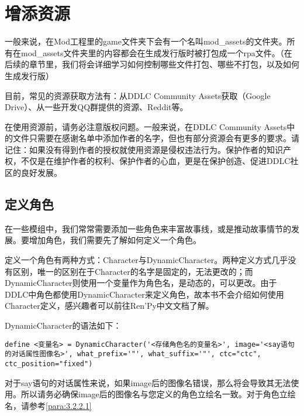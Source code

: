 \section{增添资源}
一般来说，在Mod工程里的game文件夹下会有一个名叫mod\_assets的文件夹。所有在mod\_assets文件夹里的内容都会在生成发行版时被打包成一个rpa文件。（在后续的章节里，我们将会详细学习如何控制哪些文件打包、哪些不打包，以及如何生成发行版）

\begin{ExtraKnowledge}
    目前，常见的资源获取方法有：从DDLC Community Assets获取（Google Drive）、从一些开发QQ群提供的资源、Reddit等。
\end{ExtraKnowledge}

\begin{Attention}
    在使用资源前，请务必注意版权问题。一般来说，在DDLC Community Assets中的文件只需要在感谢名单中添加作者的名字，但也有部分资源会有更多的要求。请记住：如果没有得到作者的授权就使用资源是侵权违法行为。保护作者的知识产权，不仅是在维护作者的权利、保护作者的心血，更是在保护创造、促进DDLC社区的良好发展。
\end{Attention}


\subsection{定义角色}
在一些模组中，我们常常需要添加一些角色来丰富故事线，或是推动故事情节的发展。要增加角色，我们需要先了解如何定义一个角色。

定义一个角色有两种方式：Character与DynamicCharacter。两种定义方式几乎没有区别，唯一的区别在于Character的名字是固定的，无法更改的；而DynamicCharacter则使用一个变量作为角色名，是动态的，可以更改。由于DDLC中角色都使用DynamicCharacter来定义角色，故本书不会介绍如何使用Character定义，感兴趣者可以前往Ren'Py中文文档了解。

DynamicCharacter的语法如下：

\begin{lstlisting}
define <变量名> = DynamicCharacter('<存储角色名的变量名>', image='<say语句的对话属性图像名>', what_prefix='"', what_suffix='"', ctc="ctc", ctc_position="fixed")
\end{lstlisting}

\begin{Warning}
    对于say语句的对话属性来说，如果image后的图像名错误，那么将会导致其无法使用。所以请务必确保image后的图像名与您定义的角色立绘名一致。对于角色立绘名，请参考\ref{para:3.2.2.1}
\end{Warning}

